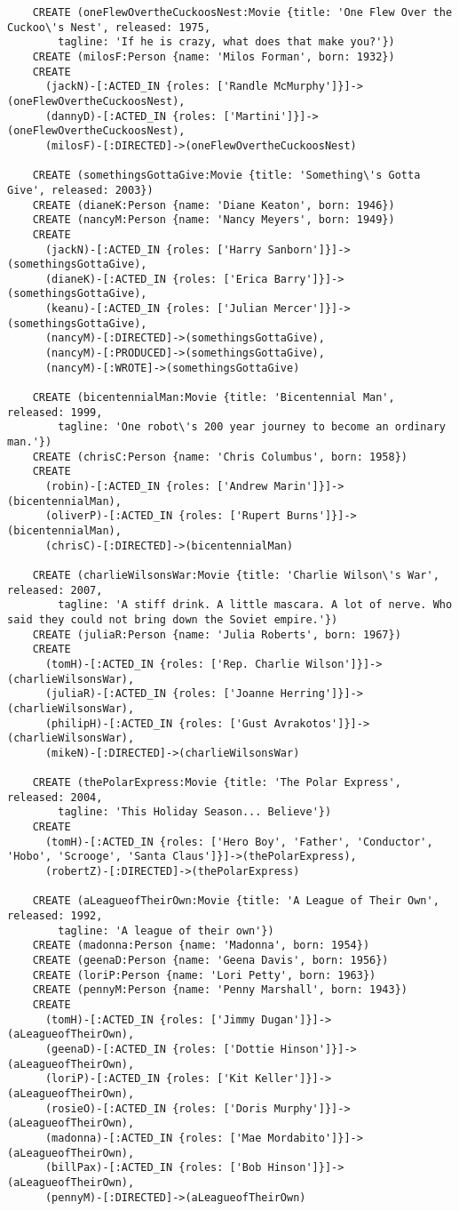 \begin{lstlisting}
	CREATE (oneFlewOvertheCuckoosNest:Movie {title: 'One Flew Over the Cuckoo\'s Nest', released: 1975,
	    tagline: 'If he is crazy, what does that make you?'})
	CREATE (milosF:Person {name: 'Milos Forman', born: 1932})
	CREATE
	  (jackN)-[:ACTED_IN {roles: ['Randle McMurphy']}]->(oneFlewOvertheCuckoosNest),
	  (dannyD)-[:ACTED_IN {roles: ['Martini']}]->(oneFlewOvertheCuckoosNest),
	  (milosF)-[:DIRECTED]->(oneFlewOvertheCuckoosNest)
	
	CREATE (somethingsGottaGive:Movie {title: 'Something\'s Gotta Give', released: 2003})
	CREATE (dianeK:Person {name: 'Diane Keaton', born: 1946})
	CREATE (nancyM:Person {name: 'Nancy Meyers', born: 1949})
	CREATE
	  (jackN)-[:ACTED_IN {roles: ['Harry Sanborn']}]->(somethingsGottaGive),
	  (dianeK)-[:ACTED_IN {roles: ['Erica Barry']}]->(somethingsGottaGive),
	  (keanu)-[:ACTED_IN {roles: ['Julian Mercer']}]->(somethingsGottaGive),
	  (nancyM)-[:DIRECTED]->(somethingsGottaGive),
	  (nancyM)-[:PRODUCED]->(somethingsGottaGive),
	  (nancyM)-[:WROTE]->(somethingsGottaGive)
	
	CREATE (bicentennialMan:Movie {title: 'Bicentennial Man', released: 1999,
	    tagline: 'One robot\'s 200 year journey to become an ordinary man.'})
	CREATE (chrisC:Person {name: 'Chris Columbus', born: 1958})
	CREATE
	  (robin)-[:ACTED_IN {roles: ['Andrew Marin']}]->(bicentennialMan),
	  (oliverP)-[:ACTED_IN {roles: ['Rupert Burns']}]->(bicentennialMan),
	  (chrisC)-[:DIRECTED]->(bicentennialMan)
	
	CREATE (charlieWilsonsWar:Movie {title: 'Charlie Wilson\'s War', released: 2007,
	    tagline: 'A stiff drink. A little mascara. A lot of nerve. Who said they could not bring down the Soviet empire.'})
	CREATE (juliaR:Person {name: 'Julia Roberts', born: 1967})
	CREATE
	  (tomH)-[:ACTED_IN {roles: ['Rep. Charlie Wilson']}]->(charlieWilsonsWar),
	  (juliaR)-[:ACTED_IN {roles: ['Joanne Herring']}]->(charlieWilsonsWar),
	  (philipH)-[:ACTED_IN {roles: ['Gust Avrakotos']}]->(charlieWilsonsWar),
	  (mikeN)-[:DIRECTED]->(charlieWilsonsWar)
	
	CREATE (thePolarExpress:Movie {title: 'The Polar Express', released: 2004,
	    tagline: 'This Holiday Season... Believe'})
	CREATE
	  (tomH)-[:ACTED_IN {roles: ['Hero Boy', 'Father', 'Conductor', 'Hobo', 'Scrooge', 'Santa Claus']}]->(thePolarExpress),
	  (robertZ)-[:DIRECTED]->(thePolarExpress)
	
	CREATE (aLeagueofTheirOwn:Movie {title: 'A League of Their Own', released: 1992,
	    tagline: 'A league of their own'})
	CREATE (madonna:Person {name: 'Madonna', born: 1954})
	CREATE (geenaD:Person {name: 'Geena Davis', born: 1956})
	CREATE (loriP:Person {name: 'Lori Petty', born: 1963})
	CREATE (pennyM:Person {name: 'Penny Marshall', born: 1943})
	CREATE
	  (tomH)-[:ACTED_IN {roles: ['Jimmy Dugan']}]->(aLeagueofTheirOwn),
	  (geenaD)-[:ACTED_IN {roles: ['Dottie Hinson']}]->(aLeagueofTheirOwn),
	  (loriP)-[:ACTED_IN {roles: ['Kit Keller']}]->(aLeagueofTheirOwn),
	  (rosieO)-[:ACTED_IN {roles: ['Doris Murphy']}]->(aLeagueofTheirOwn),
	  (madonna)-[:ACTED_IN {roles: ['Mae Mordabito']}]->(aLeagueofTheirOwn),
	  (billPax)-[:ACTED_IN {roles: ['Bob Hinson']}]->(aLeagueofTheirOwn),
	  (pennyM)-[:DIRECTED]->(aLeagueofTheirOwn)
	

\end{lstlisting}
